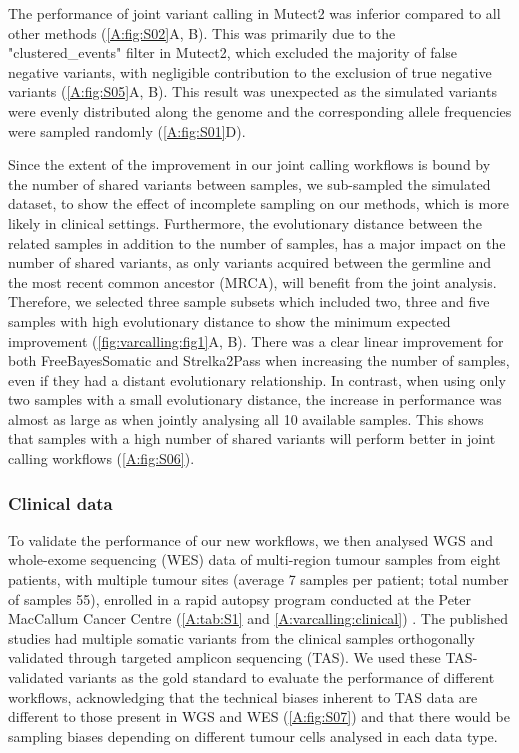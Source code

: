 The performance of joint variant calling in Mutect2 was inferior compared to all other methods (\autoref{A:fig:S02}A, B). This was primarily due to the "clustered\_events" filter in Mutect2, which excluded the majority of false negative variants, with negligible contribution to the exclusion of true negative variants (\autoref{A:fig:S05}A, B). This result was unexpected as the simulated variants were evenly distributed along the genome and the corresponding allele frequencies were sampled randomly (\autoref{A:fig:S01}D).

Since the extent of the improvement in our joint calling workflows is bound by the number of shared variants between samples, we sub-sampled the simulated dataset, to show the effect of incomplete sampling on our methods, which is more likely in clinical settings. Furthermore, the evolutionary distance between the related samples in addition to the number of samples, has a major impact on the number of shared variants, as only variants acquired between the germline and the most recent common ancestor (MRCA), will benefit from the joint analysis. Therefore, we selected three sample subsets which included two, three and five samples with high evolutionary distance to show the minimum expected improvement (\autoref{fig:varcalling:fig1}A, B). There was a clear linear improvement for both FreeBayesSomatic and Strelka2Pass when increasing the number of samples, even if they had a distant evolutionary relationship. In contrast, when using only two samples with a small evolutionary distance, the increase in performance was almost as large as when jointly analysing all 10 available samples. This shows that samples with a high number of shared variants will perform better in joint calling workflows (\autoref{A:fig:S06}).

\subsubsection{Clinical data}
\label{variantcalling-sec:realdata}
To validate the performance of our new workflows, we then analysed WGS and whole-exome sequencing (WES) data of multi-region tumour samples from eight patients, with multiple tumour sites (average 7 samples per patient; total number of samples 55), enrolled in a rapid autopsy program conducted at the Peter MacCallum Cancer Centre (\autoref{A:tab:S1} and \autoref{A:varcalling:clinical}) \parencite{Solomon2020, Vergara2021}. The published studies had multiple somatic variants from the clinical samples orthogonally validated through targeted amplicon sequencing (TAS). We used these TAS-validated variants as the gold standard to evaluate the performance of different workflows, acknowledging that the technical biases inherent to TAS data are different to those present in WGS and WES (\autoref{A:fig:S07}) and that there would be sampling biases depending on different tumour cells analysed in each data type.

